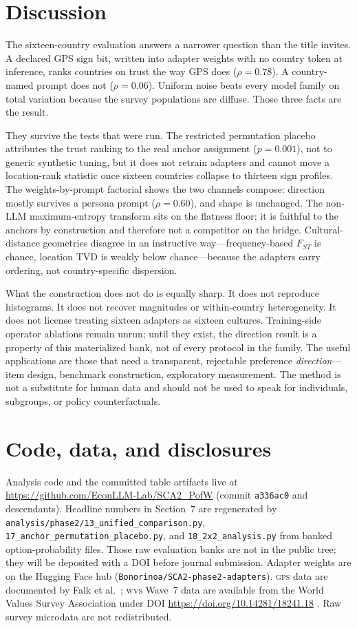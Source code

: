 \documentclass[10pt,letterpaper]{article}
\newcommand{\WVS}{\textsc{wvs}}
\newcommand{\GPS}{\textsc{gps}}
\begin{document}
\section{Discussion}
The sixteen-country evaluation answers a narrower question than the title invites. A declared GPS sign bit, written into adapter weights with no country token at inference, ranks countries on trust the way GPS does ($\rho=0.78$). A country-named prompt does not ($\rho=0.06$). Uniform noise beats every model family on total variation because the survey populations are diffuse. Those three facts are the result.

They survive the tests that were run. The restricted permutation placebo attributes the trust ranking to the real anchor assignment ($p=0.001$), not to generic synthetic tuning, but it does not retrain adapters and cannot move a location-rank statistic once sixteen countries collapse to thirteen sign profiles. The weights-by-prompt factorial shows the two channels compose: direction mostly survives a persona prompt ($\rho=0.60$), and shape is unchanged. The non-LLM maximum-entropy transform sits on the flatness floor; it is faithful to the anchors by construction and therefore not a competitor on the bridge. Cultural-distance geometries disagree in an instructive way---frequency-based $F_{ST}$ is chance, location TVD is weakly below chance---because the adapters carry ordering, not country-specific dispersion.

What the construction does not do is equally sharp. It does not reproduce histograms. It does not recover magnitudes or within-country heterogeneity. It does not license treating sixteen adapters as sixteen cultures. Training-side operator ablations remain unrun; until they exist, the direction result is a property of this materialized bank, not of every protocol in the family. The useful applications are those that need a transparent, rejectable preference \emph{direction}---item design, benchmark construction, exploratory measurement. The method is not a substitute for human data and should not be used to speak for individuals, subgroups, or policy counterfactuals.


\section*{Code, data, and disclosures}
Analysis code and the committed table artifacts live at \url{https://github.com/EconLLM-Lab/SCA2_PofW} (commit \texttt{a336ac0} and descendants). Headline numbers in Section~7 are regenerated by \texttt{analysis/phase2/13\_unified\_comparison.py}, \texttt{17\_anchor\_permutation\_placebo.py}, and \texttt{18\_2x2\_analysis.py} from banked option-probability files. Those raw evaluation banks are not in the public tree; they will be deposited with a DOI before journal submission. Adapter weights are on the Hugging Face hub (\texttt{Bonorinoa/SCA2-phase2-adapters}). \GPS{} data are documented by Falk et al.\ \cite{falk2018}; \WVS{} Wave~7 data are available from the World Values Survey Association under DOI \url{https://doi.org/10.14281/18241.18} \cite{wvs2022}. Raw survey microdata are not redistributed.
\end{document}

